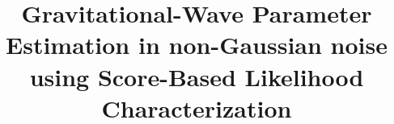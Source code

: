 \documentclass[twocolumn]{aastex631}
\begin{document}
\title{Gravitational-Wave Parameter Estimation in non-Gaussian noise\\ using Score-Based Likelihood Characterization}


\end{document}
